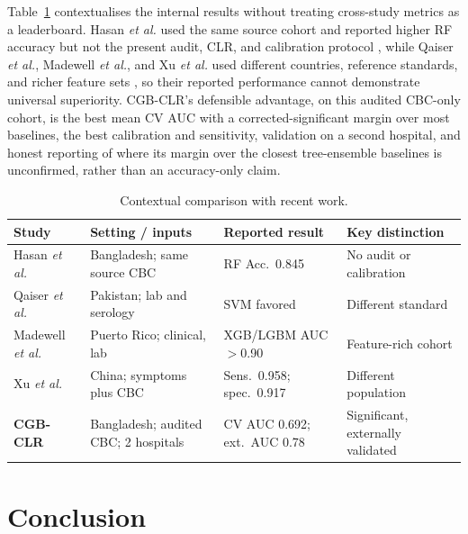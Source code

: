 \documentclass[conference]{IEEEtran}
\begin{document}
Table~\ref{tab:external} contextualises the internal results without treating
cross-study metrics as a leaderboard. Hasan \emph{et al.} used the same source
cohort and reported higher RF accuracy but not the present audit, CLR, and
calibration protocol \cite{hasan2026}, while Qaiser \emph{et al.}, Madewell
\emph{et al.}, and Xu \emph{et al.} used different countries, reference
standards, and richer feature sets \cite{qaiser2024,madewell2025,xu2026}, so
their reported performance cannot demonstrate universal superiority. CGB-CLR's
defensible advantage, on this audited CBC-only cohort, is the best mean CV AUC
with a corrected-significant margin over most baselines, the best calibration
and sensitivity, validation on a second hospital, and honest reporting of
where its margin over the closest tree-ensemble baselines is unconfirmed,
rather than an accuracy-only claim.

\begin{table}[!htbp]
\caption{Contextual comparison with recent work.}
\label{tab:external}\centering\footnotesize
\setlength{\tabcolsep}{3pt}
\begin{tabular}{|p{}|p{}|p{}|p{}|}\hline
\textbf{Study}&\textbf{Setting / inputs}&\textbf{Reported result}&\textbf{Key distinction}\\\hline
Hasan \emph{et al.} \cite{hasan2026}&Bangladesh; same source CBC&RF Acc.\ 0.845&No audit or calibration\\\hline
Qaiser \emph{et al.} \cite{qaiser2024}&Pakistan; lab and serology&SVM favored&Different standard\\\hline
Madewell \emph{et al.} \cite{madewell2025}&Puerto Rico; clinical, lab&XGB/LGBM AUC $>$0.90&Feature-rich cohort\\\hline
Xu \emph{et al.} \cite{xu2026}&China; symptoms plus CBC&Sens.\ 0.958; spec.\ 0.917&Different population\\\hline
\textbf{CGB-CLR}&Bangladesh; audited CBC; 2 hospitals&CV AUC 0.692; ext.\ AUC 0.78&Significant, externally validated\\\hline
\end{tabular}
\end{table}

\FloatBarrier
\section{Conclusion}
\end{document}
